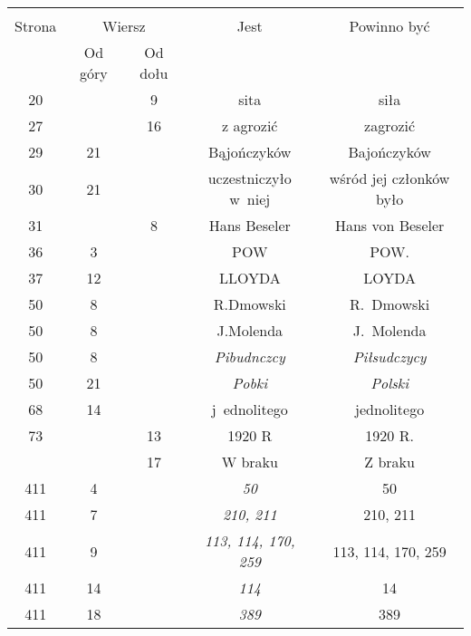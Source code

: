 \documentclass[a4paper,11pt]{article}
\begin{document}
\begin{center}
  \begin{tabular}{|c|c|c|c|c|}
    \hline
    & \multicolumn{2}{c|}{} & & \\
    Strona & \multicolumn{2}{c|}{Wiersz} & Jest
                              & Powinno być \\ \cline{2-3}
    & Od góry & Od dołu & & \\
    \hline
    20  & &  9 & sita & siła \\
    27  & & 16 & z agrozić & zagrozić \\
    29  & 21 & & Bąjończyków & Bajończyków \\
    30  & 21 & & uczestniczyło w~niej & wśród jej członków było \\
    31  & &  8 & Hans Beseler & Hans von Beseler \\
    36  &  3 & & POW & POW. \\
    37  & 12 & & LLOYDA & LOYDA \\
    50  &  8 & & R.Dmowski & R.~Dmowski \\
    50  &  8 & & J.Molenda & J.~Molenda \\
    50  &  8 & & \emph{Pibudnczcy} & \emph{Piłsudczycy} \\
    50  & 21 & & \emph{Pobki} & \emph{Polski} \\
    68  & 14 & & j~ednolitego & jednolitego \\
    73  & & 13 & 1920 R & 1920 R. \\
    & & 17 & W braku & Z braku \\
    411 &  4 & & \emph{50} & 50 \\
    411 &  7 & & \emph{210, 211} & 210, 211 \\
    411 &  9 & & \emph{113, 114, 170, 259} & 113, 114, 170, 259 \\
    411 & 14 & & \emph{114} & 14 \\
    411 & 18 & & \emph{389} & 389 \\

\end{tabular}
\end{center}
\end{document}
